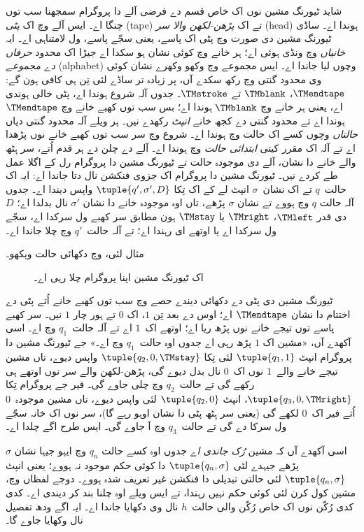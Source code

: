 \documentclass[../../../include/open-logic-section]{subfiles}
\begin{document}
\begin{explain}
شاید ٹیورنگ مشین نوں اک خاص قسم
دے فرضی آلے دا پروگرام سمجھنا
سب توں چنگا اے۔ ایس آلے وچ اک
\emph{پٹی} (tape) تے اک
\emph{پڑھن-لکھن والا سر} (head)
ہوندا اے۔ ساڈی ٹیورنگ مشین دی
صورت وچ پٹی اک پاسے، یعنی سجّے
پاسے، ول لامتناہی اے۔ ایہ
\emph{خانیاں} وچ ونڈی ہوئی اے؛
ہر خانے وچ کوئی نشان ہو سکدا اے
جیڑا اک محدود \emph{حرفاں دے مجموعے}
(alphabet) وچوں لیا جاندا اے۔
ایس مجموعے وچ وکھو وکھرے
نشان کوئی وی محدود گنتی وچ
رکھ سکدے آں،
پر زیادہ تر ساڈے لئی تِن ہی کافی
ہون گے: $\TMendtape$،
$\TMblank$ تے $\TMstroke$۔
جدوں آلہ شروع ہوندا اے،
پٹی خالی ہوندی اے، یعنی
ہر خانے وچ $\TMblank$ ہوندا اے؛
بس سب توں کھبے خانے وچ
$\TMendtape$ ہوندا اے تے
محدود گنتی دے کجھ خانے
\emph{انپٹ} رکھدے نیں۔
ہر ویلے آلہ محدود گنتی
دیاں \emph{حالتاں} وچوں
کسے اک حالت وچ ہوندا اے۔
شروع وچ سر سب توں کھبے
خانے نوں پڑھدا اے تے آلہ
اک مقرر کیتی \emph{ابتدائی حالت}
وچ ہوندا اے۔ آلے دے چلن
دے ہر قدم اُتے، سر ہِٹھ
والے خانے دا نشان، آلے
دی موجودہ حالت تے ٹیورنگ
مشین دا پروگرام رل کے
اگلا عمل طے کردے نیں۔
ٹیورنگ مشین دا پروگرام
اک جزوی فنکشن نال دتا جاندا
اے: ایہ اک حالت~$q$
تے اک نشان~$\sigma$
انپٹ لے کے اک تِکا
$\tuple{q', \sigma',
  D}$ واپس دیندا اے۔
جدوں آلہ حالت $q$
وچ ہووے تے نشان $\sigma$
پڑھے، تاں اوہ موجودہ
خانے دا نشان $\sigma'$
نال بدلدا اے؛ $D$
دی قدر $\TMleft$،
$\TMright$ یا $\TMstay$
ہون مطابق سر کھبے ول سرکدا اے،
سجّے ول سرکدا اے یا اوتھے ای رہندا اے؛
تے آلہ حالت~$q'$
وچ چلا جاندا اے۔

مثال لئی، 
وچ دکھائی حالت ویکھو۔
\begin{figure}
  \caption{اک ٹیورنگ مشین اپنا پروگرام چلا رہی اے۔}
\end{figure}
ٹیورنگ مشین دی پٹی دے
دکھائی دیندے حصے وچ
سب توں کھبے خانے اُتے
پٹی دے اختتام دا نشان
$\TMendtape$ اے؛ اوس دے
بعد تِن $1$، اک $0$
تے ہور چار $1$ نیں۔
سر کھبے پاسے توں تیجے
خانے نوں پڑھ ریا اے؛
اوتھے اک~$1$ اے تے
آلہ حالت~$q_1$ وچ اے۔
اسی آکھدے آں، «مشین
اک $1$ پڑھ رہی اے
جدوں اوہ حالت~$q_1$
وچ اے۔» جے ٹیورنگ
مشین دا پروگرام انپٹ
$\tuple{q_1, 1}$ لئی
تِکا $\tuple{q_2,
0, \TMstay}$ واپس دیوے،
تاں مشین تیجے خانے
والے~$1$ نوں اک~$0$
نال بدل دیوے گی،
پڑھن-لکھن والے سر نوں
اوتھے ہی رکھے گی تے
حالت~$q_2$ وچ چلی
جاوے گی۔ فیر جے پروگرام
تِکا $\tuple{q_3, 0, \TMright}$،
انپٹ $\tuple{q_2, 0}$
لئی واپس دیوے، تاں مشین
موجودہ~$0$ اُتے فیر
اک~$0$ لکھے گی
(یعنی سر ہِٹھ پٹی دا نشان
اوہو رہے گا)، سر نوں اک خانہ
سجّے ول سرکا دے گی تے حالت~$q_3$
وچ آ جاوے گی۔ ایس
طرح اگے چلدا اے۔

اسی آکھدے آں کہ مشین
\emph{رُک جاندی اے} جدوں
اوہ کسے حالت $q_n$ وچ
ایہو جیہا نشان $\sigma$ پڑھے جیہدے لئی
$\tuple{q_n, \sigma}$
دا کوئی حکم موجود نہ ہووے؛
یعنی انپٹ
$\tuple{q_n,\sigma}$
لئی حالتی تبدیلی
دا فنکشن غیر تعریف شدہ
ہووے۔ دوجے لفظاں وچ،
مشین کول کرن لئی
کوئی حکم نہیں رہندا،
تے ایس ویلے اوہ
چلنا بند کر دیندی اے۔
کدی کدی رُکّن نوں
اک خاص رُکّن والی
حالت~$h$ نال وی
دکھایا جاندا اے۔
ایہ اگے ودھ تفصیل
نال وکھایا جاوے گا۔
\end{explain}
\end{document}
